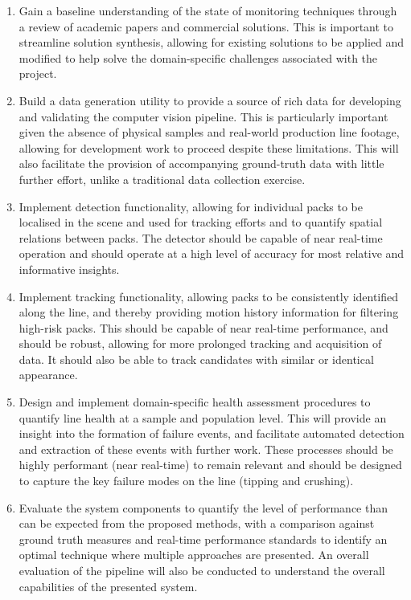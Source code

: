 \documentclass[10pt]{article}
\begin{document}
\begin{enumerate}
    \item Gain a baseline understanding of the state of monitoring techniques through a review of academic papers and commercial solutions. This is important to streamline solution synthesis, allowing for existing solutions to be applied and modified to help solve the domain-specific challenges associated with the project.
    
    \item Build a data generation utility to provide a source of rich data for developing and validating the computer vision pipeline. This is particularly important given the absence of physical samples and real-world production line footage, allowing for development work to proceed despite these limitations. This will also facilitate the provision of accompanying ground-truth data with little further effort, unlike a traditional data collection exercise.
    
    \item Implement detection functionality, allowing for individual packs to be localised in the scene and used for tracking efforts and to quantify spatial relations between packs. The detector should be capable of near real-time operation and should operate at a high level of accuracy for most relative and informative insights.

    \item Implement tracking functionality, allowing packs to be consistently identified along the line, and thereby providing motion history information for filtering high-risk packs. This should be capable of near real-time performance, and should be robust, allowing for more prolonged tracking and acquisition of data. It should also be able to track candidates with similar or identical appearance.
    
    \item Design and implement domain-specific health assessment procedures to quantify line health at a sample and population level. This will provide an insight into the formation of failure events, and facilitate automated detection and extraction of these events with further work. These processes should be highly performant (near real-time) to remain relevant and should be designed to capture the key failure modes on the line (tipping and crushing).
    
    \item Evaluate the system components to quantify the level of performance than can be expected from the proposed methods, with a comparison against ground truth measures and real-time performance standards to identify an optimal technique where multiple approaches are presented. An overall evaluation of the pipeline will also be conducted to understand the overall capabilities of the presented system.
    

\end{enumerate}
\end{document}
